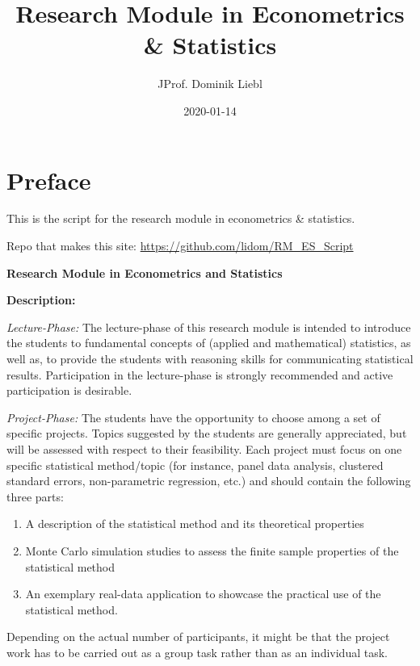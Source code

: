 \documentclass[]{book}
\title{Research Module in Econometrics \& Statistics}
\author{JProf. Dominik Liebl}
\date{2020-01-14}
\providecommand{\tightlist}{%
  \setlength{\itemsep}{0pt}\setlength{\parskip}{0pt}}
\theoremstyle{definition}
\theoremstyle{definition}
\theoremstyle{definition}
\theoremstyle{remark}
\begin{document}
\maketitle

{
\setcounter{tocdepth}{1}
\tableofcontents
}
\hypertarget{preface}{%
\chapter*{Preface}\label{preface}}

This is the script for the research module in econometrics \& statistics.

Repo that makes this site: \url{https://github.com/lidom/RM_ES_Script}

\textbf{Research Module in Econometrics and Statistics}

\textbf{Description:}

\emph{Lecture-Phase:} The lecture-phase of this research module is intended to introduce the students to fundamental concepts of (applied and mathematical) statistics, as well as, to provide the students with reasoning skills for communicating statistical results. Participation in the lecture-phase is strongly recommended and active participation is desirable.

\emph{Project-Phase:} The students have the opportunity to choose among a set of specific projects. Topics suggested by the students are generally appreciated, but will be assessed with respect to their feasibility. Each project must focus on one specific statistical method/topic (for instance, panel data analysis, clustered standard errors, non-parametric regression, etc.) and should contain the following three parts:

\begin{enumerate}
\def\labelenumi{\arabic{enumi}.}
\tightlist
\item
  A description of the statistical method and its theoretical properties
\item
  Monte Carlo simulation studies to assess the finite sample properties of the statistical method
\item
  An exemplary real-data application to showcase the practical use of the statistical method.
\end{enumerate}

Depending on the actual number of participants, it might be that the project work has to be carried out as a group task rather than as an individual task.
\end{document}
